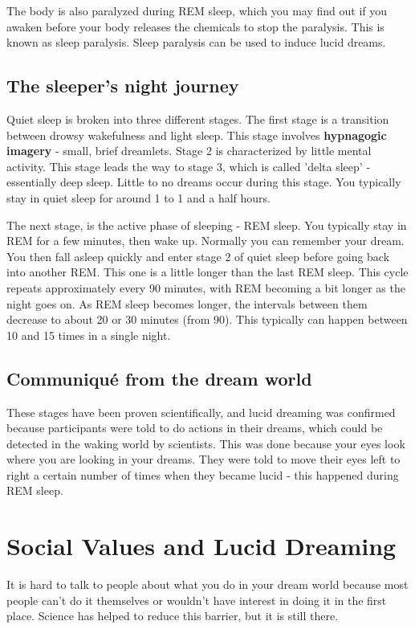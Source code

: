 \documentclass{book}
\begin{document}
The body is also paralyzed during REM sleep, which you may find out if you awaken before your body releases the chemicals to stop the paralysis. This is known as sleep paralysis. Sleep paralysis can be used to induce lucid dreams.

\subsection{The sleeper's night journey}
Quiet sleep is broken into three different stages. The first stage is a transition between drowsy wakefulness and light sleep. This stage involves \textbf{hypnagogic imagery} - small, brief dreamlets. Stage 2 is characterized by little mental activity. This stage leads the way to stage 3, which is called 'delta sleep' - essentially deep sleep. Little to no dreams occur during this stage. You typically stay in quiet sleep for around 1 to 1 and a half hours.

The next stage, is the active phase of sleeping - REM sleep. You typically stay in REM for a few minutes, then wake up. Normally you can remember your dream. You then fall asleep quickly and enter stage 2 of quiet sleep before going back into another REM. This one is a little longer than the last REM sleep. This cycle repeats approximately every 90 minutes, with REM becoming a bit longer as the night goes on. As REM sleep becomes longer, the intervals between them decrease to about 20 or 30 minutes (from 90). This typically can happen between 10 and 15 times in a single night.

\subsection{Communiqu\'{e} from the dream world}
These stages have been proven scientifically, and lucid dreaming was confirmed because participants were told to do actions in their dreams, which could be detected in the waking world by scientists. This was done because your eyes look where you are looking in your dreams. They were told to move their eyes left to right a certain number of times when they became lucid - this happened during REM sleep.

\section{Social Values and Lucid Dreaming}
It is hard to talk to people about what you do in your dream world because most people can't do it themselves or wouldn't have interest in doing it in the first place. Science has helped to reduce this barrier, but it is still there.
\end{document}
